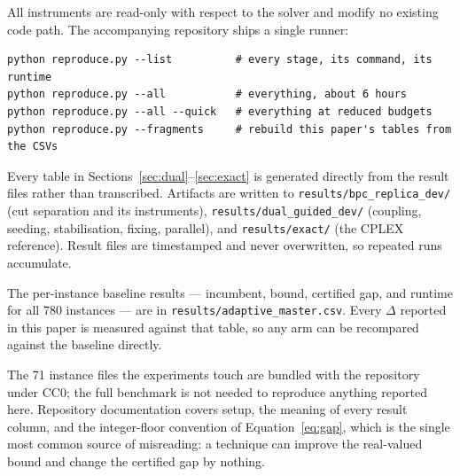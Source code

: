 \documentclass[11pt,a4paper]{article}
\begin{document}
All instruments are read-only with respect to the solver and modify no existing
code path. The accompanying repository ships a single runner:

\begin{verbatim}
python reproduce.py --list          # every stage, its command, its runtime
python reproduce.py --all           # everything, about 6 hours
python reproduce.py --all --quick   # everything at reduced budgets
python reproduce.py --fragments     # rebuild this paper's tables from the CSVs
\end{verbatim}

Every table in Sections~\ref{sec:dual}--\ref{sec:exact} is generated directly from
the result files rather than transcribed. Artifacts are written to
\texttt{results/bpc\_replica\_dev/} (cut separation and its instruments),
\texttt{results/dual\_guided\_dev/} (coupling, seeding, stabilisation, fixing,
parallel), and \texttt{results/exact/} (the CPLEX reference). Result files are
timestamped and never overwritten, so repeated runs accumulate.

The per-instance baseline results --- incumbent, bound, certified gap, and runtime
for all 780 instances --- are in \texttt{results/adaptive\_master.csv}. Every
$\Delta$ reported in this paper is measured against that table, so any arm can be
recompared against the baseline directly.

The 71 instance files the experiments touch are bundled with the repository under
CC0; the full benchmark is not needed to reproduce anything reported here.
Repository documentation covers setup, the meaning of every result column, and the
integer-floor convention of Equation~\eqref{eq:gap}, which is the single most
common source of misreading: a technique can improve the real-valued bound and
change the certified gap by nothing.
\end{document}
